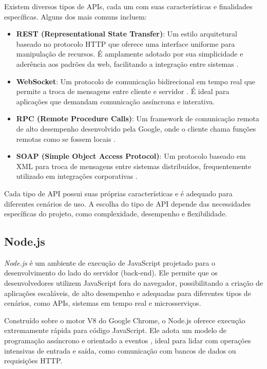 Existem diversos tipos de APIs, cada um com suas características e finalidades específicas. Alguns dos mais comuns incluem:

\begin{itemize}
    \item \textbf{REST (Representational State Transfer)}: Um estilo arquitetural baseado no protocolo HTTP que oferece uma interface uniforme para manipulação de recursos. É amplamente adotado por sua simplicidade e aderência aos padrões da web, facilitando a integração entre sistemas \cite{restful-api}.
    \item \textbf{WebSocket}: Um protocolo de comunicação bidirecional em tempo real que permite a troca de mensagens entre cliente e servidor \cite{ws-standard}. É ideal para aplicações que demandam comunicação assíncrona e interativa.
    \item \textbf{RPC (Remote Procedure Calls)}: Um framework de comunicação remota de alto desempenho desenvolvido pela Google, onde o cliente chama funções remotas como se fossem locais \cite{rpc-google}.
    \item \textbf{SOAP (Simple Object Access Protocol)}: Um protocolo baseado em XML para troca de mensagens entre sistemas distribuídos, frequentemente utilizado em integrações corporativas \cite{soap-hirsch2007mobile}.
\end{itemize}

Cada tipo de API possui suas próprias características e é adequado para diferentes cenários de uso. A escolha do tipo de API depende das necessidades específicas do projeto, como complexidade, desempenho e flexibilidade.


\subsection{Node.js}


\emph{Node.js} é um ambiente de execução de JavaScript projetado para o desenvolvimento do lado do servidor (back-end). Ele permite que os desenvolvedores utilizem JavaScript fora do navegador, possibilitando a criação de aplicações escaláveis, de alto desempenho e adequadas para diferentes tipos de cenários, como APIs, sistemas em tempo real e microsserviços.

Construído sobre o motor V8 do Google Chrome, o Node.js oferece execução extremamente rápida para código JavaScript. Ele adota um modelo de programação assíncrono e orientado a eventos \cite{nodejs-about}, ideal para lidar com operações intensivas de entrada e saída, como comunicação com bancos de dados ou requisições HTTP.

